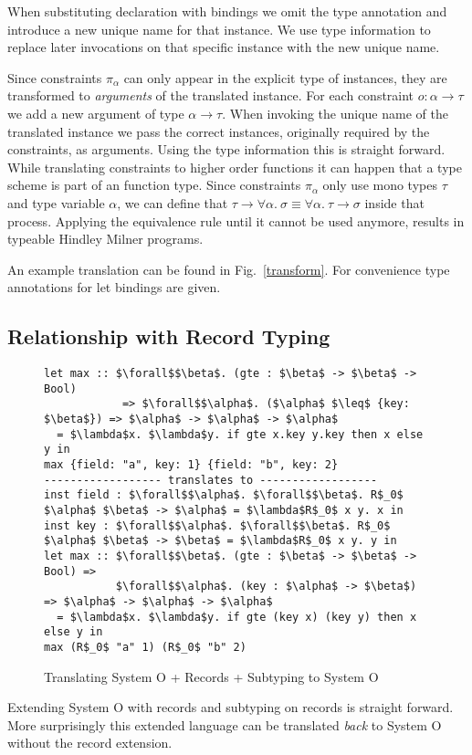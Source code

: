 \documentclass[runningheads]{llncs}
\newcommand{\snip}[1]{\footnotesize{\ttfamily{#1}}}
\begin{document}
When substituting \snip{inst} declaration with \snip{let} bindings we omit the type annotation and introduce a new unique name for that instance. 
We use type information to replace later invocations on that specific instance with the new unique name. 

Since constraints $\pi_\alpha$ can only appear in the explicit type of instances, they are transformed to \emph{arguments} of the translated instance.
For each constraint $o : \alpha \rightarrow \tau$ we add a new argument of type $\alpha \rightarrow \tau$. 
When invoking the unique name of the translated instance we pass the correct instances, originally required by the constraints, as arguments. 
Using the type information this is straight forward. 
While translating constraints to higher order functions it can happen that a type scheme is part of an function type. 
Since constraints $\pi_\alpha$ only use mono types $\tau$ and type variable $\alpha$, we can define that $\tau \rightarrow \forall \alpha. \ \sigma \equiv \forall \alpha. \ \tau \rightarrow \sigma$ inside that process.
Applying the equivalence rule until it cannot be used anymore, results in typeable Hindley Milner programs.

An example translation can be found in Fig.~\ref{transform}. For convenience type annotations for let bindings are given.

\subsection{Relationship with Record Typing}
\begin{figure}
  \begin{lstlisting}
let max :: $\forall$$\beta$. (gte : $\beta$ -> $\beta$ -> Bool) 
            => $\forall$$\alpha$. ($\alpha$ $\leq$ {key: $\beta$}) => $\alpha$ -> $\alpha$ -> $\alpha$      
  = $\lambda$x. $\lambda$y. if gte x.key y.key then x else y in
max {field: "a", key: 1} {field: "b", key: 2}
------------------ translates to ------------------
inst field : $\forall$$\alpha$. $\forall$$\beta$. R$_0$ $\alpha$ $\beta$ -> $\alpha$ = $\lambda$R$_0$ x y. x in
inst key : $\forall$$\alpha$. $\forall$$\beta$. R$_0$ $\alpha$ $\beta$ -> $\beta$ = $\lambda$R$_0$ x y. y in
let max :: $\forall$$\beta$. (gte : $\beta$ -> $\beta$ -> Bool) => 
           $\forall$$\alpha$. (key : $\alpha$ -> $\beta$) => $\alpha$ -> $\alpha$ -> $\alpha$
  = $\lambda$x. $\lambda$y. if gte (key x) (key y) then x else y in
max (R$_0$ "a" 1) (R$_0$ "b" 2)  
  \end{lstlisting}
  \caption{Translating System O + Records + Subtyping to System O~\cite{oww95}} \label{translate}
\end{figure}
Extending System O with records and subtyping on records is straight forward.
More surprisingly this extended language can be translated \emph{back} to System O without the record extension.
\end{document}
